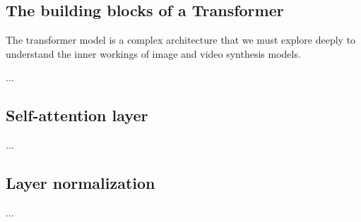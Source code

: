\subsection{The building blocks of a Transformer}
\label{appendix:transformer_blocks}

The transformer model is a complex architecture that we must explore deeply to understand the inner workings of image and video synthesis models.

...

\subsection*{Self-attention layer}

...

\subsection*{Layer normalization}
\label{appendix:layer_normalization}

...